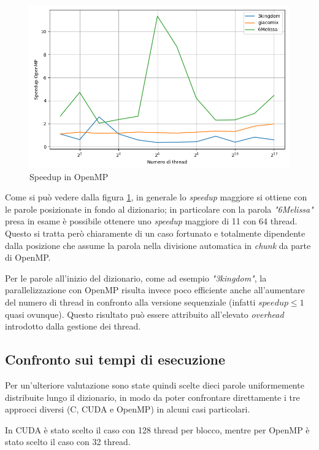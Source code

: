 \documentclass[10pt,twocolumn,letterpaper]{article}
\begin{document}
\begin{figure}[h]
\includegraphics[width=\linewidth]{Plots/tempi_openmp.png}
\caption{Speedup in OpenMP}
\label{fig:tempi_openmp}
\end{figure}

Come si può vedere dalla figura 	\ref{fig:tempi_openmp}, in generale lo \textit{speedup} maggiore si ottiene con le parole posizionate in fondo al dizionario; in particolare con la parola \textit{"6Melissa"} presa in esame è possibile ottenere uno \textit{speedup} maggiore di 11 con 64 thread. Questo si tratta però chiaramente di un caso fortunato e totalmente dipendente dalla posizione che assume la parola nella divisione automatica in \textit{chunk} da parte di OpenMP.

Per le parole all'inizio del dizionario, come ad esempio \textit{"3kingdom"}, la parallelizzazione con OpenMP risulta invece poco efficiente anche all'aumentare del numero di thread in confronto alla versione sequenziale (infatti $speedup \le 1$ quasi ovunque). Questo risultato può essere attribuito all'elevato \textit{overhead} introdotto dalla gestione dei thread.
\subsection{Confronto sui tempi di esecuzione}
Per un'ulteriore valutazione sono state quindi scelte dieci parole uniformemente distribuite lungo il dizionario, in modo da poter confrontare direttamente i tre approcci diversi (C, CUDA e OpenMP) in alcuni casi particolari.

In CUDA è stato scelto il caso con 128 thread per blocco, mentre per OpenMP è stato scelto il caso con 32 thread.
\end{document}
